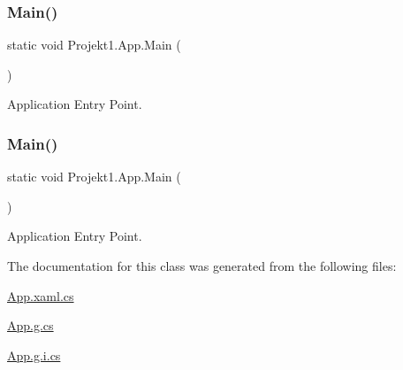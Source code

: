 \subsubsection{\texorpdfstring{Main()}{Main()}\hspace{0.1cm}{\footnotesize\ttfamily [1/2]}}
{\footnotesize\ttfamily static void Projekt1.\+App.\+Main (\begin{DoxyParamCaption}{ }\end{DoxyParamCaption})\hspace{0.3cm}{\ttfamily [static]}}



Application Entry Point. 

\mbox{\label{class_projekt1_1_1_app_a3277cdd767e14a1c69be2aedd7004a5d}} 
\subsubsection{\texorpdfstring{Main()}{Main()}\hspace{0.1cm}{\footnotesize\ttfamily [2/2]}}
{\footnotesize\ttfamily static void Projekt1.\+App.\+Main (\begin{DoxyParamCaption}{ }\end{DoxyParamCaption})\hspace{0.3cm}{\ttfamily [static]}}



Application Entry Point. 



The documentation for this class was generated from the following files\+:\begin{DoxyCompactItemize}
\item 
\mbox{\hyperlink{_app_8xaml_8cs}{App.\+xaml.\+cs}}\item 
\mbox{\hyperlink{_app_8g_8cs}{App.\+g.\+cs}}\item 
\mbox{\hyperlink{_app_8g_8i_8cs}{App.\+g.\+i.\+cs}}\end{DoxyCompactItemize}
